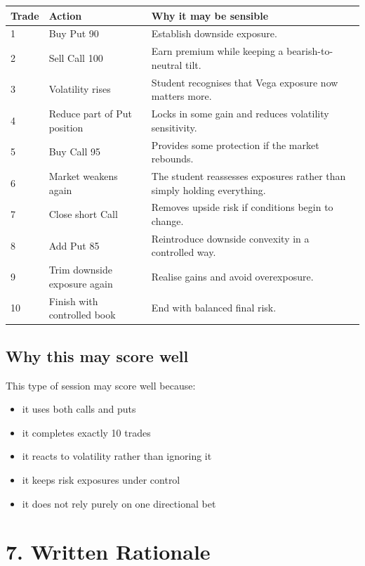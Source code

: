 \documentclass[11pt,a4paper]{article}
\begin{document}
\begin{longtable}{>{\raggedright}p{1.2cm} >{\raggedright}p{4.8cm} >{\raggedright\arraybackslash}p{8.2cm}}
\toprule
Trade & Action & Why it may be sensible \\
\midrule
1 & Buy Put 90 & Establish downside exposure. \\
2 & Sell Call 100 & Earn premium while keeping a bearish-to-neutral tilt. \\
3 & Volatility rises & Student recognises that Vega exposure now matters more. \\
4 & Reduce part of Put position & Locks in some gain and reduces volatility sensitivity. \\
5 & Buy Call 95 & Provides some protection if the market rebounds. \\
6 & Market weakens again & The student reassesses exposures rather than simply holding everything. \\
7 & Close short Call & Removes upside risk if conditions begin to change. \\
8 & Add Put 85 & Reintroduce downside convexity in a controlled way. \\
9 & Trim downside exposure again & Realise gains and avoid overexposure. \\
10 & Finish with controlled book & End with balanced final risk. \\
\bottomrule
\end{longtable}

\subsection*{Why this may score well}

This type of session may score well because:
\begin{itemize}[leftmargin=1.5em]
\item it uses both calls and puts
\item it completes exactly 10 trades
\item it reacts to volatility rather than ignoring it
\item it keeps risk exposures under control
\item it does not rely purely on one directional bet
\end{itemize}

\section*{7. Written Rationale}
\end{document}
